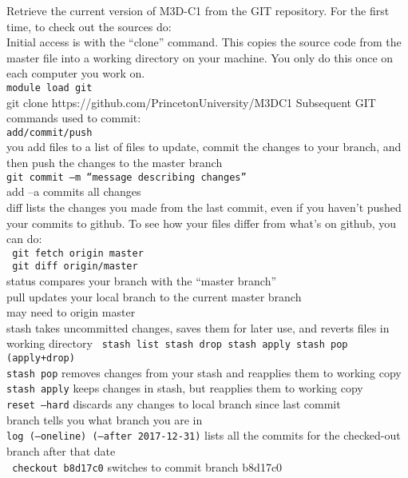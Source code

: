 Retrieve the current version of M3D-C1 from the GIT repository.  For the first time, to check out the sources do:
\\
Initial access is with the “clone” command.   This copies the source code from the master file into a working directory on your machine.   You only do this once on each computer you work on.
\\
\texttt{module load git
}
\\
git clone https://github.com/PrincetonUniversity/M3DC1
\newline\newline
Subsequent GIT commands used to commit:
\\
\texttt{add/commit/push}\\
you add files to a list of files to update, commit the changes to your branch, and then push the changes to the master branch
\\
\texttt{git commit –m “message describing changes”}
\\
add –a commits all changes
\\
diff lists the changes you made from the last commit, even if you haven’t pushed your commits to github.    To see how your files differ from what’s on github, you can do:
\\
\texttt{		git fetch origin master
}
\\
\texttt{
		git diff origin/master
}
\\
status compares your branch with the “master branch”
\\
pull updates your local branch to the current master branch
\\
	may need to origin master
\\
stash takes uncommitted changes, saves them for later use, and reverts files in working directory
\texttt{
	stash list	stash drop	stash apply	stash pop (apply+drop)
}
\\
\texttt{stash pop} removes changes from your stash and reapplies them to working copy
\\
\texttt{stash apply} keeps changes in stash, but reapplies them to working copy
\\
\texttt{reset –hard} discards any changes to local branch since last commit
\\
branch tells you what branch you are in
\\
\texttt{log (--oneline) (--after 2017-12-31)} lists all the commits for the checked-out branch after that date
\\
\texttt{
checkout b8d17c0} switches to commit branch b8d17c0

